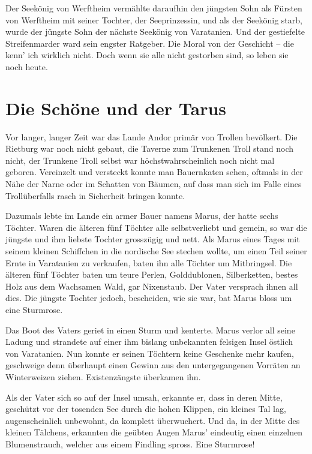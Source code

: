 \documentclass[10pt, a4paper, oneside]{book}
\begin{document}
Der Seekönig von Werftheim vermählte daraufhin den jüngsten Sohn als Fürsten von Werftheim mit seiner Tochter, der Seeprinzessin, und als der Seekönig starb, wurde der jüngste Sohn der nächste Seekönig von Varatanien. Und der gestiefelte Streifenmarder ward sein engster Ratgeber. Die Moral von der Geschicht – die kenn’ ich wirklich nicht. Doch wenn sie alle nicht gestorben sind, so leben sie noch heute.




\newpage
\section{Die Schöne und der Tarus}


Vor langer, langer Zeit war das Lande Andor primär von Trollen bevölkert. Die Rietburg war noch nicht gebaut, die Taverne zum Trunkenen Troll stand noch nicht, der Trunkene Troll selbst war höchstwahrscheinlich noch nicht mal geboren. Vereinzelt und versteckt konnte man Bauernkaten sehen, oftmals in der Nähe der Narne oder im Schatten von Bäumen, auf dass man sich im Falle eines Trollüberfalls rasch in Sicherheit bringen konnte.

Dazumals lebte im Lande ein armer Bauer namens Marus, der hatte sechs Töchter. Waren die älteren fünf Töchter alle selbstverliebt und gemein, so war die jüngste und ihm liebste Tochter grosszügig und nett. Als Marus eines Tages mit seinem kleinen Schiffchen in die nordische See stechen wollte, um einen Teil seiner Ernte in Varatanien zu verkaufen, baten ihn alle Töchter um Mitbringsel. Die älteren fünf Töchter baten um teure Perlen, Golddublonen, Silberketten, bestes Holz aus dem Wachsamen Wald, gar Nixenstaub. Der Vater versprach ihnen all dies. Die jüngste Tochter jedoch, bescheiden, wie sie war, bat Marus bloss um eine Sturmrose.

Das Boot des Vaters geriet in einen Sturm und kenterte. Marus verlor all seine Ladung und strandete auf einer ihm bislang unbekannten felsigen Insel östlich von Varatanien. Nun konnte er seinen Töchtern keine Geschenke mehr kaufen, geschweige denn überhaupt einen Gewinn aus den untergegangenen Vorräten an Winterweizen ziehen. Existenzängste überkamen ihn.

Als der Vater sich so auf der Insel umsah, erkannte er, dass in deren Mitte, geschützt vor der tosenden See durch die hohen Klippen, ein kleines Tal lag, augenscheinlich unbewohnt, da komplett überwuchert. Und da, in der Mitte des kleinen Tälchens, erkannten die geübten Augen Marus’ eindeutig einen einzelnen Blumenstrauch, welcher aus einem Findling spross. Eine Sturmrose!
\end{document}
